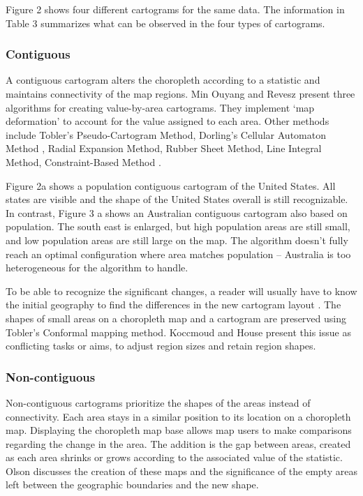 \documentclass{monashthesis}
\begin{document}
Figure 2 shows four different cartograms for the same data. The information in Table 3 summarizes what can be observed in the four types of cartograms.

\hypertarget{contiguous}{%
\subsubsection{Contiguous}\label{contiguous}}

A contiguous cartogram alters the choropleth according to a statistic and maintains connectivity of the map regions. Min Ouyang and Revesz \autocite{ACA} present three algorithms for creating value-by-area cartograms. They implement `map deformation' to account for the value assigned to each area. Other methods include Tobler's Pseudo-Cartogram Method, Dorling's Cellular Automaton Method \autocite{ACTUC}, Radial Expansion Method, Rubber Sheet Method, Line Integral Method, Constraint-Based Method \autocite{CBATCC}.

Figure 2a shows a population contiguous cartogram of the United States. All states are visible and the shape of the United States overall is still recognizable. In contrast, Figure 3 a shows an Australian contiguous cartogram also based on population. The south east is enlarged, but high population areas are still small, and low population areas are still large on the map. The algorithm doesn't fully reach an optimal configuration where area matches population -- Australia is too heterogeneous for the algorithm to handle.

To be able to recognize the significant changes, a reader will usually have to know the initial geography to find the differences in the new cartogram layout \autocite{NAC}. The shapes of small areas on a choropleth map and a cartogram are preserved using Tobler's Conformal mapping method.
Koccmoud and House \autocite{CBATCC} present this issue as conflicting tasks or aims, to adjust region sizes and retain region shapes.

\hypertarget{non-contiguous}{%
\subsubsection{Non-contiguous}\label{non-contiguous}}

Non-contiguous cartograms prioritize the shapes of the areas instead of connectivity. Each area stays in a similar position to its location on a choropleth map. Displaying the choropleth map base allows map users to make comparisons regarding the change in the area. The addition is the gap between areas, created as each area shrinks or grows according to the associated value of the statistic. Olson \autocite{NAC} discusses the creation of these maps and the significance of the empty areas left between the geographic boundaries and the new shape.
\end{document}
